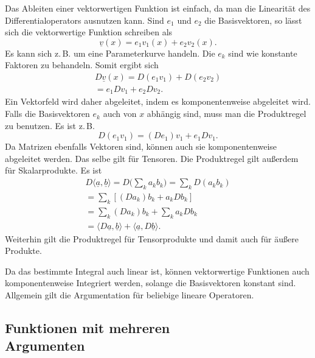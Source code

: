 \documentclass[a4paper,10pt,fleqn,twocolumn,twoside]{article}
\numberwithin{equation}{section}
\begin{document}
Das Ableiten einer vektorwertigen Funktion ist einfach, da man
die Linearität des Differentialoperators ausnutzen kann. Sind $e_1$
und $e_2$ die Basisvektoren, so lässt sich die vektorwertige
Funktion schreiben als
\begin{equation}
\underline v(x) = e_1v_1(x)+e_2v_2(x).
\end{equation}
Es kann sich z.\,B. um eine Parameterkurve handeln. Die $e_k$ sind
wie konstante Faktoren zu behandeln. Somit ergibt sich
\begin{gather*}
D\underline v(x) = D(e_1v_1)+D(e_2v_2)\\
= e_1Dv_1+e_2Dv_2.
\end{gather*}
Ein Vektorfeld wird daher abgeleitet, indem es komponentenweise
abgeleitet wird. Falls die Basisvektoren $e_k$
auch von $x$ abhängig sind, muss man die Produktregel zu benutzen.
Es ist z.\,B.
\begin{equation}
D(e_1v_1) = (De_1)v_1+e_1Dv_1.
\end{equation}
Da Matrizen ebenfalls Vektoren sind, können auch sie komponentenweise
abgeleitet werden. Das selbe gilt für Tensoren. Die Produktregel
gilt außerdem für Skalarprodukte. Es ist
\begin{gather*}D\langle\underline a,\underline b\rangle
= D\Big(\sum\nolimits_k a_kb_k\Big) = \sum\nolimits_k D(a_kb_k)\\
= \sum\nolimits_k [(Da_k)b_k+a_kDb_k]\\
= \sum\nolimits_k (Da_k)b_k + \sum\nolimits_k a_kDb_k\\
= \langle D\underline a,\underline b\rangle
+ \langle \underline a,D\underline b\rangle.
\end{gather*}
Weiterhin gilt die Produktregel für Tensorprodukte und damit auch
für äußere Produkte.

Da das bestimmte Integral auch linear ist, können vektorwertige
Funktionen auch komponentenweise Integriert werden, solange die
Basisvektoren konstant sind. Allgemein gilt die Argumentation für
beliebige lineare Operatoren.


\subsection[Funktionen mit mehreren Argumenten]
{Funktionen mit mehreren\\
Argumenten}
\end{document}
